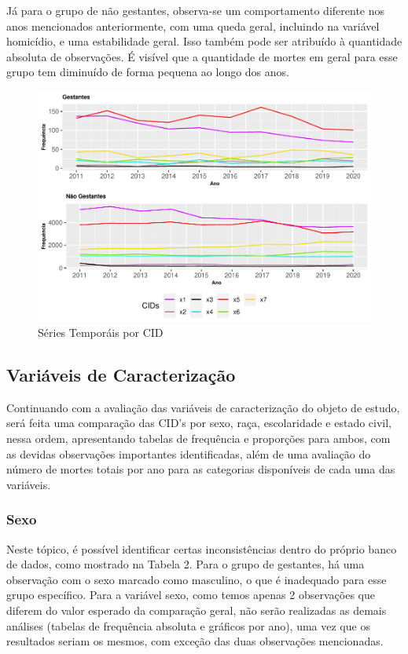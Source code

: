 \documentclass[
]{article}
\begin{document}
Já para o grupo de não gestantes, observa-se um comportamento diferente
nos anos mencionados anteriormente, com uma queda geral, incluindo na
variável homicídio, e uma estabilidade geral. Isso também pode ser
atribuído à quantidade absoluta de observações. É visível que a
quantidade de mortes em geral para esse grupo tem diminuído de forma
pequena ao longo dos anos.

\begin{figure}
\centering
\includegraphics{RelatorioV01_files/figure-latex/unnamed-chunk-3-1.pdf}
\caption{Séries Temporáis por CID}
\end{figure}

\hypertarget{variuxe1veis-de-caracterizauxe7uxe3o}{%
\subsection{Variáveis de
Caracterização}\label{variuxe1veis-de-caracterizauxe7uxe3o}}

Continuando com a avaliação das variáveis de caracterização do objeto de
estudo, será feita uma comparação das CID's por sexo, raça, escolaridade
e estado civil, nessa ordem, apresentando tabelas de frequência e
proporções para ambos, com as devidas observações importantes
identificadas, além de uma avaliação do número de mortes totais por ano
para as categorias disponíveis de cada uma das variáveis.

\hypertarget{sexo}{%
\subsubsection{Sexo}\label{sexo}}

Neste tópico, é possível identificar certas inconsistências dentro do
próprio banco de dados, como mostrado na Tabela 2. Para o grupo de
gestantes, há uma observação com o sexo marcado como masculino, o que é
inadequado para esse grupo específico. Para a variável sexo, como temos
apenas 2 observações que diferem do valor esperado da comparação geral,
não serão realizadas as demais análises (tabelas de frequência absoluta
e gráficos por ano), uma vez que os resultados seriam os mesmos, com
exceção das duas observações mencionadas.
\end{document}
